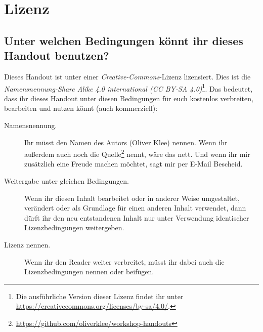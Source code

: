 \chapter{Lizenz}
\label{lizenz}

\section*{Unter welchen Bedingungen könnt ihr dieses Handout benutzen?}
Dieses Handout ist unter einer \emph{Creative-Commons}-Lizenz lizensiert. Dies ist die \emph{Namensnennung-Share Alike 4.0 international (CC BY-SA 4.0)}\footnote{Die ausführliche Version dieser Lizenz findet ihr unter \url{https://creativecommons.org/licenses/by-sa/4.0/}.}. Das bedeutet, dass ihr dieses Handout unter diesen Bedingungen für euch kostenlos verbreiten, bearbeiten und nutzen könnt (auch kommerziell):

\begin{description}
  \item[Namensnennung.] Ihr müsst den Namen des Autors (Oliver Klee) nennen. Wenn ihr außerdem auch noch die Quelle\footnote{\url{https://github.com/oliverklee/workshop-handouts}} nennt, wäre das nett. Und wenn ihr mir zusätzlich eine Freude machen möchtet, sagt mir per E-Mail Bescheid.
  \item[Weitergabe unter gleichen Bedingungen.] Wenn ihr diesen Inhalt bearbeitet oder in anderer Weise umgestaltet, verändert oder als Grundlage für einen anderen Inhalt verwendet, dann dürft ihr den neu entstandenen Inhalt nur unter Verwendung identischer Lizenzbedingungen weitergeben.
  \item[Lizenz nennen.] Wenn ihr den Reader weiter verbreitet, müsst ihr dabei auch die Lizenzbedingungen nennen oder beifügen.
\end{description}
